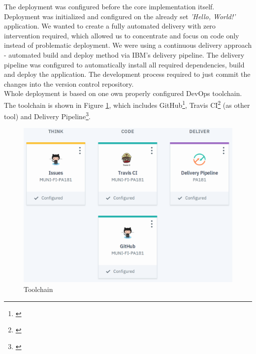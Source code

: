 \documentclass[11pt,a4paper]{article}
\begin{document}
The deployment was configured before the core implementation itself. Deployment was initialized and configured on the already set \textit{'Hello, World!'} application. We wanted to create a fully automated delivery with zero intervention required, which allowed us to concentrate and focus on code only instead of problematic deployment. We were using a continuous delivery approach - automated build and deploy method via IBM's delivery pipeline. The delivery pipeline was configured to automatically install all required dependencies, build and deploy the application. The development process required to just commit the changes into the version control repository.\\

Whole deployment is based on one own properly configured DevOps toolchain. The toolchain is shown in Figure \ref{fig:toolchain}, which includes GitHub\footnote{\href{https://console.bluemix.net/docs/services/ContinuousDelivery/toolchains\_integrations.html\#github}{\color{urlcolor}{console.bluemix.net/docs/services/ContinuousDelivery/toolchains\_integrations.html\#github}}}, Travis CI\footnote{\href{https://console.bluemix.net/docs/services/ContinuousDelivery/toolchains\_integrations.html\#othertool}{\color{urlcolor}{console.bluemix.net/docs/services/ContinuousDelivery/toolchains\_integrations.html\#othertool}}} (as other tool) and Delivery Pipeline\footnote{\href{https://console.bluemix.net/docs/services/ContinuousDelivery/toolchains\_integrations.html\#deliverypipeline}{\color{urlcolor}{console.bluemix.net/docs/services/ContinuousDelivery/toolchains\_integrations.html\#deliverypipeline}}}.

\begin{figure}[H]
    \centering
    \includegraphics[scale=0.3]{img/toolchain.png}
    \caption{Toolchain}
    \label{fig:toolchain}
\end{figure}
\end{document}
